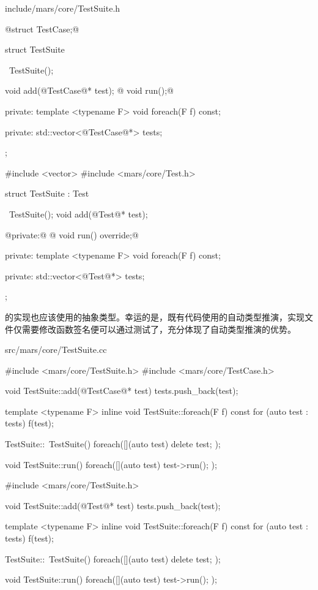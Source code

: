 \begin{content}
\begin{diff}{include/mars/core/TestSuite.h}
\begin{minicpp}
@struct TestCase;@

struct TestSuite {
  ~TestSuite();

  void add(@TestCase@* test);
@  void run();@

private:
  template <typename F>
  void foreach(F f) const;

private:
  std::vector<@TestCase@*> tests;
};
 \end{minicpp}
\tcblower
 \begin{minicpp}
#include <vector>
#include <mars/core/Test.h>

struct TestSuite : Test {
  ~TestSuite();
  void add(@Test@* test);

@private:@
@  void run() override;@

private:
  template <typename F>
  void foreach(F f) const;

private:
  std::vector<@Test@*> tests;
};
 \end{minicpp}
\end{diff}

的实现也应该使用的抽象类型。幸运的是，既有代码使用的自动类型推演，实现文件仅需要修改函数签名便可以通过测试了，充分体现了自动类型推演的优势。

\begin{diff}{src/mars/core/TestSuite.cc}
 \begin{minicpp}
#include <mars/core/TestSuite.h>
#include <mars/core/TestCase.h>

void TestSuite::add(@TestCase@* test) {
  tests.push_back(test);
}

template <typename F>
inline void TestSuite::foreach(F f) const {
  for (auto test : tests) {
    f(test);
  }
}

TestSuite::~TestSuite() {
  foreach([](auto test) {
    delete test;
  });
}

void TestSuite::run() {
  foreach([](auto test) {
    test->run();
  });
} 
 \end{minicpp}
\tcblower
 \begin{minicpp}
#include <mars/core/TestSuite.h>

void TestSuite::add(@Test@* test) {
  tests.push_back(test);
}

template <typename F>
inline void TestSuite::foreach(F f) const {
  for (auto test : tests) {
    f(test);
  }
}

TestSuite::~TestSuite() {
  foreach([](auto test) {
    delete test;
  });
}

void TestSuite::run() {
  foreach([](auto test) {
    test->run();
  });
}
 \end{minicpp}
\end{diff}


\end{content}
